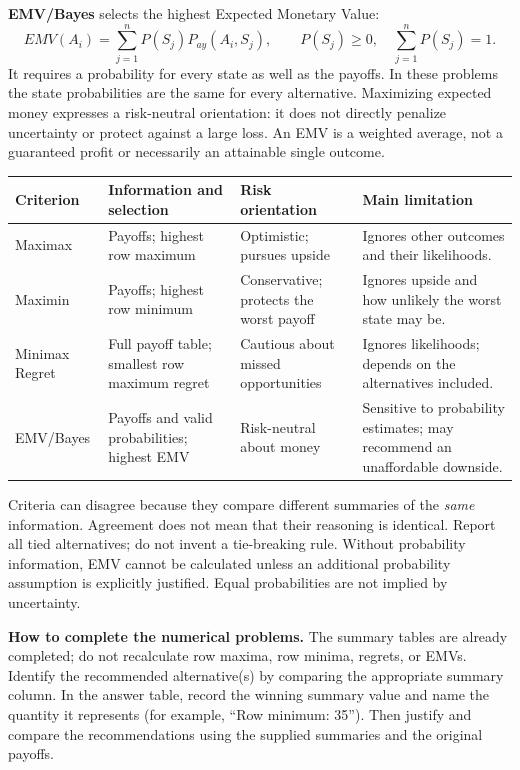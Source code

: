 \textbf{EMV/Bayes} selects the highest Expected Monetary Value:
\[
EMV(A_i)=\sum_{j=1}^{n}P(S_j)P_{ay}(A_i,S_j),\qquad
P(S_j)\geq0,\quad\sum_{j=1}^{n}P(S_j)=1.
\]
It requires a probability for every state as well as the payoffs. In these problems the state probabilities are the same for every alternative. Maximizing expected money expresses a risk-neutral orientation: it does not directly penalize uncertainty or protect against a large loss. An EMV is a weighted average, not a guaranteed profit or necessarily an attainable single outcome.

\begin{center}
\small
\begin{tabularx}{\textwidth}{@{}>{\raggedright\arraybackslash}p{}*{3}{>{\raggedright\arraybackslash}X}@{}}
\toprule
Criterion & Information and selection & Risk orientation & Main limitation\\
\midrule
Maximax & Payoffs; highest row maximum & Optimistic; pursues upside & Ignores other outcomes and their likelihoods.\\
Maximin & Payoffs; highest row minimum & Conservative; protects the worst payoff & Ignores upside and how unlikely the worst state may be.\\
Minimax Regret & Full payoff table; smallest row maximum regret & Cautious about missed opportunities & Ignores likelihoods; depends on the alternatives included.\\
EMV/Bayes & Payoffs and valid probabilities; highest EMV & Risk-neutral about money & Sensitive to probability estimates; may recommend an unaffordable downside.\\
\bottomrule
\end{tabularx}
\end{center}
Criteria can disagree because they compare different summaries of the \emph{same} information. Agreement does not mean that their reasoning is identical. Report all tied alternatives; do not invent a tie-breaking rule. Without probability information, EMV cannot be calculated unless an additional probability assumption is explicitly justified. Equal probabilities are not implied by uncertainty.

\textbf{How to complete the numerical problems.} The summary tables are already completed; do not recalculate row maxima, row minima, regrets, or EMVs. Identify the recommended alternative(s) by comparing the appropriate summary column. In the answer table, record the winning summary value and name the quantity it represents (for example, ``Row minimum: 35''). Then justify and compare the recommendations using the supplied summaries and the original payoffs.

